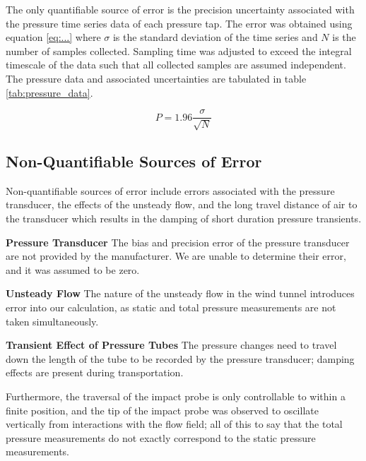 \documentclass[runningheads]{llncs}
\begin{document}
The only quantifiable source of error is the precision uncertainty associated with the pressure time series data of each pressure tap. The error was obtained using equation \ref{eq:...} where $\sigma$ is the standard deviation of the time series and $N$ is the number of samples collected. Sampling time was adjusted to exceed the integral timescale of the data such that all collected samples are assumed independent. The pressure data and associated uncertainties are tabulated in table \ref{tab:pressure_data}.

\begin{equation}
    P = 1.96 \frac{\sigma}{\sqrt{N}}
    \label{eq:...}
\end{equation}

\subsection{Non-Quantifiable Sources of Error}

Non-quantifiable sources of error include errors associated with the pressure transducer, the effects of the unsteady flow, and the long travel distance of air to the transducer which results in the damping of short duration pressure transients.\newline

\noindent
\textbf{Pressure Transducer} The bias and precision error of the pressure transducer are not provided by the manufacturer. We are unable to determine their error, and it was assumed to be zero.\newline

\noindent
\textbf{Unsteady Flow} The nature of the unsteady flow in the wind tunnel introduces error into our calculation, as static and total pressure measurements are not taken simultaneously. \newline

\noindent
\textbf{Transient Effect of Pressure Tubes}  The pressure changes need to travel down the length of the tube to be recorded by the pressure transducer; damping effects are present during transportation. \newline

\noindent
Furthermore, the traversal of the impact probe is only controllable to within a finite position, and the tip of the impact probe was observed to oscillate vertically from interactions with the flow field; all of this to say that the total pressure measurements do not exactly correspond to the static pressure measurements.
\end{document}

